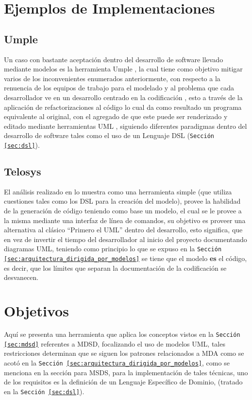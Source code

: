 \section{Ejemplos de Implementaciones}

\subsection{Umple}
Un caso con bastante aceptación dentro del desarrollo de software llevado
mediante modelos es la herramienta Umple {\cite{umple-official}}, la cual tiene
como objetivo mitigar varios de los inconvenientes enumerados anteriormente, con
respecto a la renuencia de los equipos de trabajo para el modelado y al
problema que cada desarrollador ve en un desarrollo centrado en la
codificación \cites{aldaeej2016}{garzon2014}, esto a través de la aplicación de
refactorizaciones al código lo cual da como resultado un programa equivalente
al original, con el agregado de que este puede ser renderizado y editado
mediante herramientas UML \cite{lethbridge2010}, siguiendo diferentes
paradigmas dentro del desarrollo de software tales como el uso de un Lenguaje
DSL (\texttt{Sección \ref{sec:dsl}}).

\subsection{Telosys}
El análisis realizado en \cite{telosys} lo muestra como una herramienta simple
(que utiliza cuestiones tales como los DSL para la creación del modelo),
provee la habilidad de la generación de código teniendo como base un modelo,
el cual se le provee a la misma mediante una interfaz de línea de comandos, su
objetivo es proveer una alternativa al clásico ``Primero el UML'' dentro del
desarrollo, esto significa, que en vez de invertir el tiempo del
desarrollador al inicio del proyecto documentando diagramas UML, teniendo como
principio lo que se expuso en la \texttt{Sección
\ref{sec:arquitectura_dirigida_por_modelos}} se
tiene que el modelo \textbf{es} el código, es decir, que los límites que separan
la documentación de la codificación se desvanecen.

\section{Objetivos}
\label{sec:problema}
Aquí se presenta una herramienta que aplica los
conceptos vistos en la \texttt{Sección \ref{sec:mdsd}} referentes a MDSD,
focalizando el uso de modelos UML, tales restricciones determinan que se siguen
los patrones relacionados a MDA como se acotó en la
\texttt{Sección \ref{sec:arquitectura_dirigida_por_modelos}}, como se menciona
en la sección para MSDS, para la implementación de tales técnicas, uno de los
requisitos es la definición de un Lenguaje Específico de Dominio, (tratado en
la \texttt{Sección \ref{sec:dsl}}).

